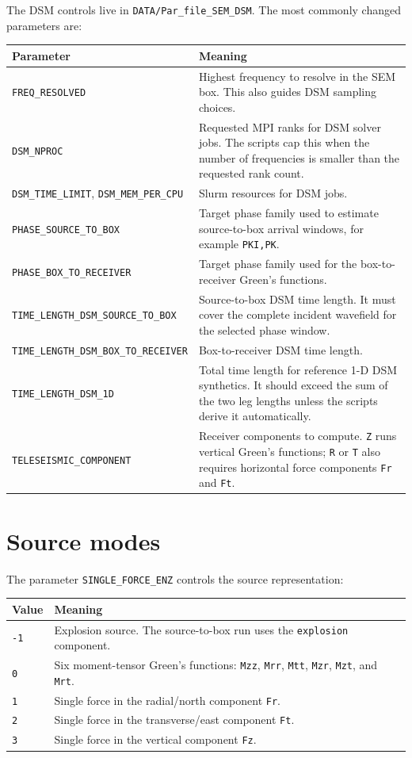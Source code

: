 \documentclass[11pt,oneside]{book}
\DeclareRobustCommand{\code}[1]{\nolinkurl{#1}}
\begin{document}
The DSM controls live in \code{DATA/Par_file_SEM_DSM}. The most commonly
changed parameters are:
\begin{longtable}{L{0.40\textwidth}L{0.51\textwidth}}
\toprule
Parameter & Meaning \\
\midrule
\code{FREQ_RESOLVED} & Highest frequency to resolve in the SEM box. This
also guides DSM sampling choices. \\
\code{DSM_NPROC} & Requested MPI ranks for DSM solver jobs. The scripts cap
this when the number of frequencies is smaller than the requested rank count. \\
\code{DSM_TIME_LIMIT}, \code{DSM_MEM_PER_CPU} & Slurm resources for DSM jobs. \\
\code{PHASE_SOURCE_TO_BOX} & Target phase family used to estimate source-to-box
arrival windows, for example \code{PKI,PK}. \\
\code{PHASE_BOX_TO_RECEIVER} & Target phase family used for the box-to-receiver
Green's functions. \\
\code{TIME_LENGTH_DSM_SOURCE_TO_BOX} & Source-to-box DSM time length. It must
cover the complete incident wavefield for the selected phase window. \\
\code{TIME_LENGTH_DSM_BOX_TO_RECEIVER} & Box-to-receiver DSM time length. \\
\code{TIME_LENGTH_DSM_1D} & Total time length for reference 1-D DSM synthetics.
It should exceed the sum of the two leg lengths unless the scripts derive it
automatically. \\
\code{TELESEISMIC_COMPONENT} & Receiver components to compute. \code{Z} runs
vertical Green's functions; \code{R} or \code{T} also requires horizontal force
components \code{Fr} and \code{Ft}. \\
\bottomrule
\end{longtable}

\section{Source modes}

The parameter \code{SINGLE_FORCE_ENZ} controls the source representation:
\begin{longtable}{L{0.18\textwidth}L{0.72\textwidth}}
\toprule
Value & Meaning \\
\midrule
\code{-1} & Explosion source. The source-to-box run uses the \code{explosion}
component. \\
\code{0} & Six moment-tensor Green's functions:
\code{Mzz}, \code{Mrr}, \code{Mtt}, \code{Mzr}, \code{Mzt}, and \code{Mrt}. \\
\code{1} & Single force in the radial/north component \code{Fr}. \\
\code{2} & Single force in the transverse/east component \code{Ft}. \\
\code{3} & Single force in the vertical component \code{Fz}. \\
\bottomrule
\end{longtable}
\end{document}

